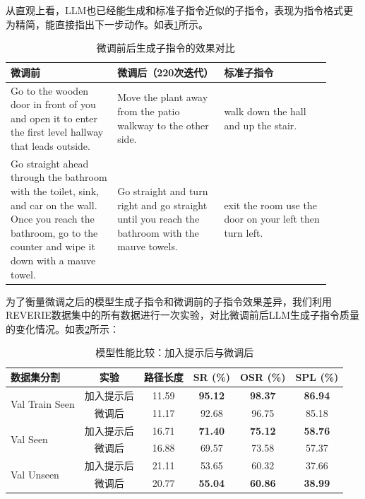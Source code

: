 \documentclass[bachelor]{thesis-uestc}
\begin{document}
从直观上看，LLM也已经能生成和标准子指令近似的子指令，表现为指令格式更为精简，能直接指出下一步动作。如表\ref{cmp}所示。
\newpage
\begin{table}[htbp]
    \centering
    \caption{微调前后生成子指令的效果对比}
    \begin{tabular}{>{\raggedright}p{0.3\linewidth}>{\raggedright}p{0.3\linewidth}>{\raggedright\arraybackslash}p{0.3\linewidth}}
    \toprule
    \textbf{微调前} & \textbf{微调后（220次迭代）} & \textbf{标准子指令} \\
    \midrule
    Go to the wooden door in front of you and open it to enter the first level hallway that leads outside. & Move the plant away from the patio walkway to the other side. & walk down the hall and up the stair. \\
    \addlinespace
    Go straight ahead through the bathroom with the toilet, sink, and car on the wall. Once you reach the bathroom, go to the counter and wipe it down with a mauve towel. & Go straight and turn right and go straight until you reach the bathroom with the mauve towels. & exit the room use the door on your left then turn left. \\
    \bottomrule
    \end{tabular}
    \label{cmp}
    \end{table}


为了衡量微调之后的模型生成子指令和微调前的子指令效果差异，我们利用REVERIE数据集中的所有数据进行一次实验，对比微调前后LLM生成子指令质量的变化情况。如表\ref{table:model_comparison}所示：

\begin{table}[htbp]
    \centering
    \caption{模型性能比较：加入提示后与微调后}
    \label{table:model_comparison}
    \begin{tabular}{@{}lccccc@{}}
    \toprule
    \textbf{数据集分割} & \textbf{实验} & \textbf{路径长度} & \textbf{SR (\%)} & \textbf{OSR (\%)} & \textbf{SPL (\%)} \\ \midrule
    \multirow{2}{*}{Val Train Seen} & 加入提示后 & 11.59 & \textbf{95.12} & \textbf{98.37} & \textbf{86.94} \\
                                    & 微调后 & 11.17 & 92.68 & 96.75 & 85.18 \\ \midrule
    \multirow{2}{*}{Val Seen}       & 加入提示后 & 16.71 & \textbf{71.40} & \textbf{75.12} & \textbf{58.76} \\
                                    & 微调后 & 16.88 & 69.57 & 73.58 & 57.37 \\ \midrule
    \multirow{2}{*}{Val Unseen}     & 加入提示后 & 21.11 & 53.65 & 60.32 & 37.66 \\
                                    & 微调后 & 20.77 & \textbf{55.04} & \textbf{60.86} & \textbf{38.99} \\
    \bottomrule
    \end{tabular}
\end{table}
\end{document}
